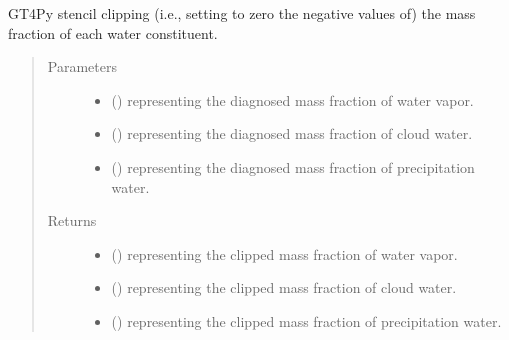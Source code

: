\documentclass[letterpaper,10pt,english]{sphinxmanual}
\begin{document}
\begin{fulllineitems}
\begin{fulllineitems}
\label{\detokenize{api:tasmania.dycore.diagnostic_isentropic.DiagnosticIsentropic._stencil_clipping_defs}}
GT4Py stencil clipping (i.e., setting to zero the negative values of) the mass fraction of each water constituent.
\begin{quote}\begin{description}
\item[{Parameters}] \leavevmode\begin{itemize}
\item {} 
 () \textendash{}  representing the diagnosed mass fraction of water vapor.

\item {} 
 () \textendash{}  representing the diagnosed mass fraction of cloud water.

\item {} 
 () \textendash{}  representing the diagnosed mass fraction of precipitation water.

\end{itemize}

\item[{Returns}] \leavevmode
\begin{itemize}
\item {} 
 () \textendash{}  representing the clipped mass fraction of water vapor.

\item {} 
 () \textendash{}  representing the clipped mass fraction of cloud water.

\item {} 
 () \textendash{}  representing the clipped mass fraction of precipitation water.

\end{itemize}


\end{description}\end{quote}


\end{fulllineitems}
\end{fulllineitems}
\end{document}
